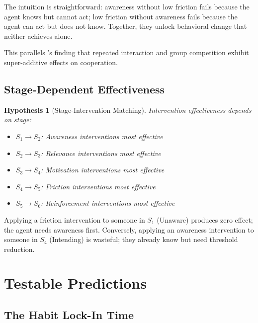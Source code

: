\documentclass[12pt]{article}
\newtheorem{hypothesis}{Hypothesis}
\begin{document}
The intuition is straightforward: awareness without low friction fails because the agent knows but cannot act; low friction without awareness fails because the agent can act but does not know. Together, they unlock behavioral change that neither achieves alone.

This parallels \citet{efferson2024superadditive}'s finding that repeated interaction and group competition exhibit super-additive effects on cooperation.

\subsection{Stage-Dependent Effectiveness}

\begin{hypothesis}[Stage-Intervention Matching]
\label{hyp:matching}
Intervention effectiveness depends on stage:
\begin{itemize}
    \item $S_1 \to S_2$: Awareness interventions most effective
    \item $S_2 \to S_3$: Relevance interventions most effective
    \item $S_3 \to S_4$: Motivation interventions most effective
    \item $S_4 \to S_5$: Friction interventions most effective
    \item $S_5 \to S_6$: Reinforcement interventions most effective
\end{itemize}
\end{hypothesis}

Applying a friction intervention to someone in $S_1$ (Unaware) produces zero effect; the agent needs awareness first. Conversely, applying an awareness intervention to someone in $S_4$ (Intending) is wasteful; they already know but need threshold reduction.



\section{Testable Predictions}

\subsection{The Habit Lock-In Time}
\end{document}
